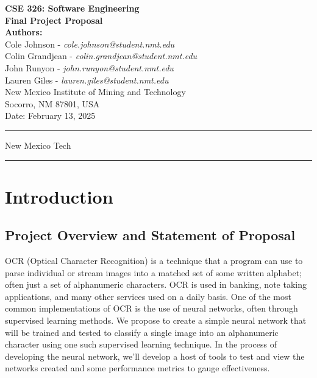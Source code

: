 \documentclass[english,12pt]{article}
\begin{document}
\begin{titlepage}
    \null
    \vspace*{2cm}
    
    \begin{center}
        {\Huge \bfseries CSE 326: Software Engineering}\\[1.5cm]
        {\Large \bfseries Final Project Proposal}\\[2cm]
        
        \textbf{Authors:} \\[0.5cm]
        Cole Johnson - \textit{cole.johnson@student.nmt.edu}\\
        Colin Grandjean - \textit{colin.grandjean@student.nmt.edu}\\
        John Runyon - \textit{john.runyon@student.nmt.edu}\\
        Lauren Giles - \textit{lauren.giles@student.nmt.edu}\\[1cm]
        
        New Mexico Institute of Mining and Technology\\
        Socorro, NM 87801, USA\\[2cm]
        
        {\large Date: February 13, 2025}
    \end{center}
    
    \vfill
    \hrule
    \smallskip
    \centerline{\sc New Mexico Tech}
    \smallskip
    \hrule
\end{titlepage}

{\footnotesize\tableofcontents} 
\pagebreak
\section{Introduction}

\subsection{Project Overview and Statement of Proposal}
OCR (Optical Character Recognition) is a technique that a program can use to 
parse individual or stream images into a matched set of some written alphabet; 
often just a set of alphanumeric characters. 
OCR is used in banking, note taking applications,
 and many other services used on a daily basis. 
One of the most common implementations of OCR is the use of neural networks, 
often through supervised learning methods. 
We propose to create a simple neural network that will be trained and tested 
to classify a single image into an alphanumeric character 
using one such supervised learning technique. 
In the process of developing the neural network, 
we'll develop a host of tools to test and 
view the networks created and some performance metrics to gauge effectiveness.
\end{document}
